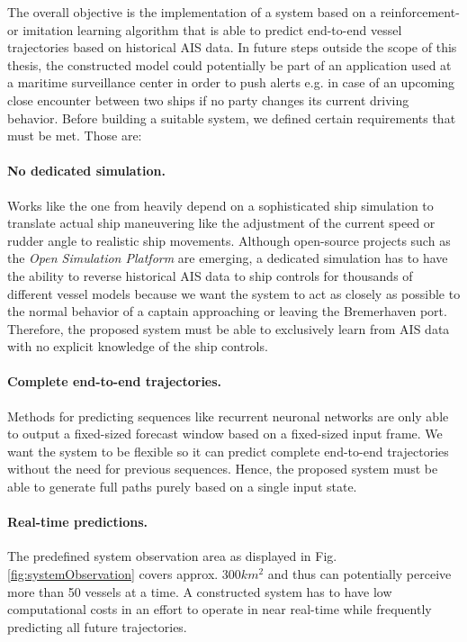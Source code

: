 The overall objective is the implementation of a system based on a reinforcement- or imitation learning algorithm that is able to predict end-to-end vessel trajectories based on historical AIS data. In future steps outside the scope of this thesis, the constructed model could potentially be part of an application used at a maritime surveillance center in order to push alerts e.g. in case of an upcoming close encounter between two ships if no party changes its current driving behavior. Before building a suitable system, we defined certain requirements that must be met. Those are:
\paragraph{No dedicated simulation.} Works like the one from \cite{westerlund2021learning} heavily depend on a sophisticated ship simulation to translate actual ship maneuvering like the adjustment of the current speed or rudder angle to realistic ship movements. Although open-source projects such as the \textit{Open Simulation Platform} \cite[]{smogeli2020open} are emerging, a dedicated simulation has to have the ability to reverse historical AIS data to ship controls for thousands of different vessel models because we want the system to act as closely as possible to the normal behavior of a captain approaching or leaving the Bremerhaven port. Therefore, the proposed system must be able to exclusively learn from AIS data with no explicit knowledge of the ship controls.

\paragraph{Complete end-to-end trajectories.}
Methods for predicting sequences like recurrent neuronal networks are only able to output a fixed-sized forecast window based on a fixed-sized input frame. We want the system to be flexible so it can predict complete end-to-end trajectories without the need for previous sequences. Hence, the proposed system must be able to generate full paths purely based on a single input state.

\paragraph{Real-time predictions.} The predefined system observation area as displayed in Fig. \ref{fig:systemObservation} covers approx. $300 km^2$ and thus can potentially perceive more than 50 vessels at a time. A constructed system has to have low computational costs in an effort to operate in near real-time while frequently predicting all future trajectories.



